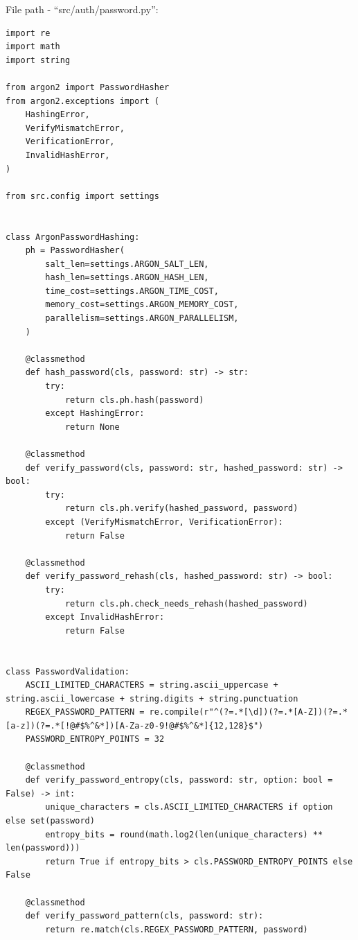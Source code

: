 File path - ``src/auth/password.py'':
\begin{lstlisting}
import re
import math
import string

from argon2 import PasswordHasher
from argon2.exceptions import (
    HashingError,
    VerifyMismatchError,
    VerificationError,
    InvalidHashError,
)

from src.config import settings


class ArgonPasswordHashing:
    ph = PasswordHasher(
        salt_len=settings.ARGON_SALT_LEN,
        hash_len=settings.ARGON_HASH_LEN,
        time_cost=settings.ARGON_TIME_COST,
        memory_cost=settings.ARGON_MEMORY_COST,
        parallelism=settings.ARGON_PARALLELISM,
    )

    @classmethod
    def hash_password(cls, password: str) -> str:
        try:
            return cls.ph.hash(password)
        except HashingError:
            return None

    @classmethod
    def verify_password(cls, password: str, hashed_password: str) -> bool:
        try:
            return cls.ph.verify(hashed_password, password)
        except (VerifyMismatchError, VerificationError):
            return False

    @classmethod
    def verify_password_rehash(cls, hashed_password: str) -> bool:
        try:
            return cls.ph.check_needs_rehash(hashed_password)
        except InvalidHashError:
            return False


class PasswordValidation:
    ASCII_LIMITED_CHARACTERS = string.ascii_uppercase + string.ascii_lowercase + string.digits + string.punctuation
    REGEX_PASSWORD_PATTERN = re.compile(r"^(?=.*[\d])(?=.*[A-Z])(?=.*[a-z])(?=.*[!@#$%^&*])[A-Za-z0-9!@#$%^&*]{12,128}$")
    PASSWORD_ENTROPY_POINTS = 32
    
    @classmethod
    def verify_password_entropy(cls, password: str, option: bool = False) -> int:
        unique_characters = cls.ASCII_LIMITED_CHARACTERS if option else set(password)
        entropy_bits = round(math.log2(len(unique_characters) ** len(password)))
        return True if entropy_bits > cls.PASSWORD_ENTROPY_POINTS else False

    @classmethod
    def verify_password_pattern(cls, password: str):
        return re.match(cls.REGEX_PASSWORD_PATTERN, password)
\end{lstlisting}

\clearpage

